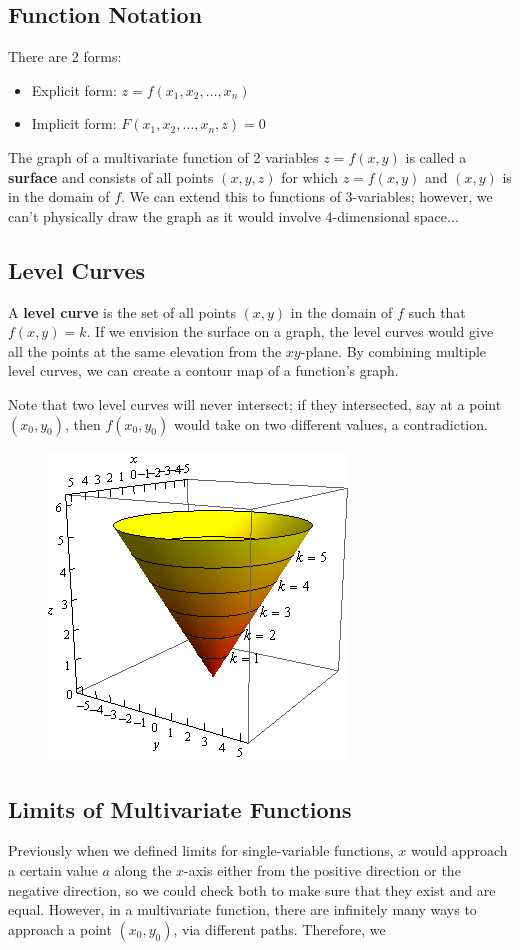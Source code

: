 \documentclass[12pt]{article}
\begin{document}
\begin{enumerate}
\subsection{Function Notation}
There are 2 forms:
\begin{itemize}
\item Explicit form: $z = f(x_1,x_2,\dots,x_n)$
\item Implicit form: $F(x_1,x_2,\dots,x_n,z) = 0$
\end{itemize}

The graph of a multivariate function of 2 variables $z=f(x,y)$ is called a \textbf{surface} and consists of all points $(x,y,z)$ for which $z = f(x,y)$ and $(x,y)$ is in the domain of $f$. We can extend this to functions of 3-variables; however, we can't physically draw the graph as it would involve 4-dimensional space$\dots$

\subsection{Level Curves}
A \textbf{level curve} is the set of all points $(x,y)$ in the domain of $f$  such that $f(x,y) = k$. If we envision the surface on a graph, the level curves would give all the points at the same elevation from the $xy$-plane. By combining multiple level curves, we can create a contour map of a function's graph.

Note that two level curves will never intersect; if they intersected, say at a point $(x_0,y_0)$, then $f(x_0,y_0)$ would take on two different values, a contradiction.

\begin{figure}[h!]
\centering
\includegraphics[scale=0.5]{level}
\end{figure}

\subsection{Limits of Multivariate Functions}
Previously when we defined limits for single-variable functions, $x$ would approach a certain value $a$ along the $x$-axis either from the positive direction or the negative direction, so we could check both to make sure that they exist and are equal. However, in a multivariate function, there are infinitely many ways to approach a point $(x_0,y_0)$, via different paths. Therefore, we 

\end{enumerate}
\end{document}
